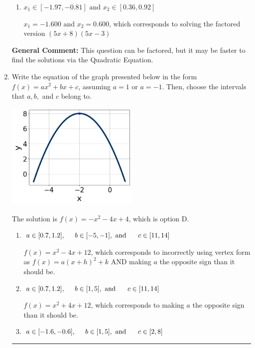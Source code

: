 \documentclass{extbook}[14pt]
\newcommand{\litem}[1]{\item #1

\rule{\textwidth}{0.4pt}}
\begin{document}
\begin{enumerate}
{\begin{enumerate}[label=\Alph*.]
$x_1 = -20.000 \text{ and } x_2 = 30.000$, which corresponds to solving the factored version $(x + 20)(x -30)$
\item \( x_1 \in [-1.97, -0.81] \text{ and } x_2 \in [0.36, 0.92] \)

$x_1 = -1.600 \text{ and } x_2 = 0.600$, which corresponds to solving the factored version $(5x + 8)(5x -3)$
\end{enumerate}

\textbf{General Comment:} This question can be factored, but it may be faster to find the solutions via the Quadratic Equation.
}
\litem{
Write the equation of the graph presented below in the form $f(x)=ax^2+bx+c$, assuming  $a=1$ or $a=-1$. Then, choose the intervals that $a, b,$ and $c$ belong to.

\begin{center}
    \includegraphics[width=0.5\textwidth]{../Figures/quadraticGraphToEquationCopyB.png}
\end{center}


The solution is \( f(x) = -x^{2} -4 x + 4 \), which is option D.\begin{enumerate}[label=\Alph*.]
\item \( a \in [0.7, 1.2], \hspace*{5mm} b \in [-5, -1], \text{ and } \hspace*{5mm} c \in [11, 14] \)

$f(x)=x^{2} -4 x + 12$, which corresponds to incorrectly using vertex form as $f(x) = a(x+h)^2+k$ AND making $a$ the opposite sign than it should be.
\item \( a \in [0.7, 1.2], \hspace*{5mm} b \in [1, 5], \text{ and } \hspace*{5mm} c \in [11, 14] \)

$f(x)=x^{2} +4 x + 12$, which corresponds to making $a$ the opposite sign than it should be.
\item \( a \in [-1.6, -0.6], \hspace*{5mm} b \in [1, 5], \text{ and } \hspace*{5mm} c \in [2, 8] \)


\end{enumerate}}
\end{enumerate}
\end{document}
